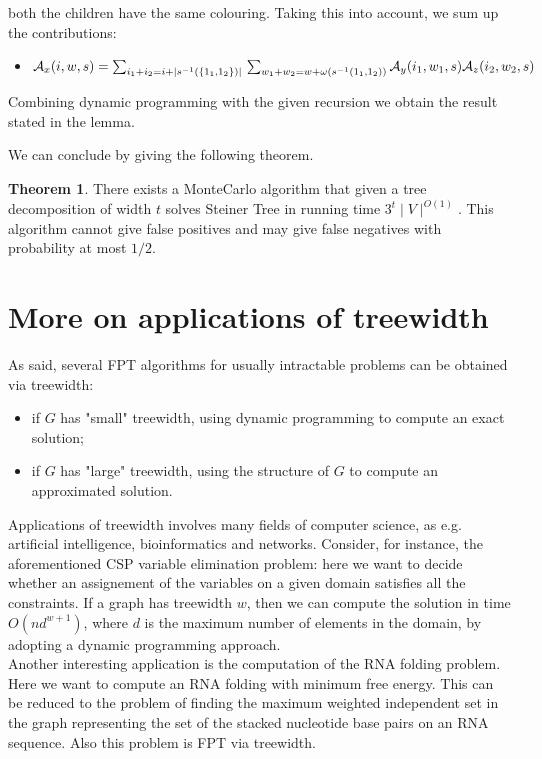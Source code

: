 \documentclass{article}
\theoremstyle{definition}
\theoremstyle{lemma}
\theoremstyle{corollary}
\theoremstyle{theorem}
\newtheorem{theorem}{Theorem}[section]
\begin{document}
\begin{itemize}
\begin{itemize}
		both the children have the same colouring. Taking this into account, we sum up the contributions:
		\begin{itemize}
			\item $\mathcal{A}_x(i,w,s) = \sum_{i_1+i_2 = i + \mid s^{-1}(\{1_1,1_2\}) \mid} \\
			\sum_{w_1+w_2 = w + \omega(s^{-1}({1_1,1_2}))} \mathcal{A}_y(i_1,w_1,s)
			\mathcal{A}_z(i_2,w_2,s)$
		\end{itemize}
	\end{itemize}
	Combining dynamic programming with the given recursion we obtain the result stated in the lemma.
\end{itemize}
We can conclude by giving the following theorem.
\begin{theorem}
	There exists a MonteCarlo algorithm that given a tree decomposition of width $t$ solves Steiner Tree
	in running time $3^t \mid V \mid^{O(1)}$. This algorithm cannot give false positives and may give
	false negatives with probability at most $1/2$.
\end{theorem}

\section{More on applications of treewidth}
As said, several FPT algorithms for usually intractable problems can be obtained via treewidth:
\begin{itemize}
	\item if $G$ has "small" treewidth, using dynamic programming to compute an exact solution;
	\item if $G$ has "large" treewidth, using the structure of $G$ to compute an approximated
	solution.
\end{itemize}
Applications of treewidth involves many fields of computer science, as e.g. artificial intelligence, bioinformatics and networks. Consider, for instance, the aforementioned CSP variable elimination problem: here we want to decide whether an assignement of the variables on a given domain satisfies all the constraints. If a graph has treewidth $w$, then we can compute the solution in time $O(nd^{w+1})$, where $d$ is the maximum number of elements in the domain, by adopting a dynamic programming approach. \\
Another interesting application is the computation of the RNA folding problem. Here we want to compute an RNA folding with minimum free energy. This can be reduced to the problem of finding the maximum weighted independent set in the graph representing the set of the stacked nucleotide base pairs on an RNA sequence. Also this problem is FPT via treewidth.
\end{document}
